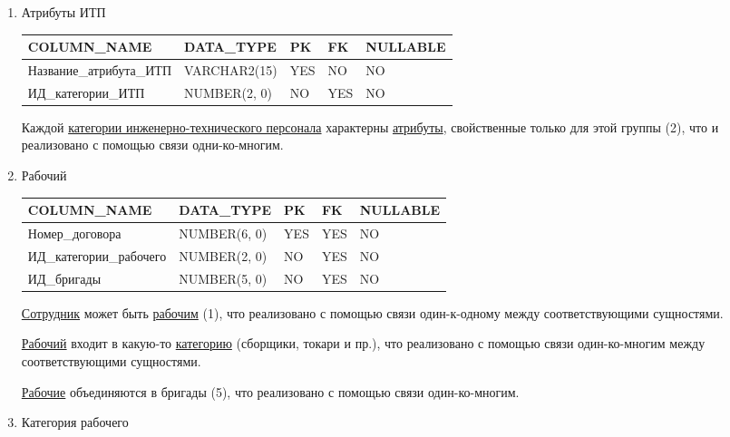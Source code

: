 \begin{enumerate}
\begin{tabular}{|p{4cm}|p{3cm}|p{1cm}|p{1cm}|p{2cm}|}
    \end{tabular}

    \item{Атрибуты ИТП}

    \begin{tabular}{|p{4cm}|p{3cm}|p{1cm}|p{1cm}|p{2cm}|} \hline

        {\bf COLUMN\_NAME} & {\bf DATA\_TYPE} & {\bf PK} & {\bf FK} & {\bf NULLABLE} \\ \hline
        Название\_атрибута\_ИТП & VARCHAR2(15) & YES & NO & NO \\ \hline
        ИД\_категории\_ИТП & NUMBER(2, 0) & NO & YES & NO \\ \hline

    \end{tabular}

    Каждой \underline{категории инженерно-технического персонала} характерны \underline{атрибуты}, свойственные только для этой группы (2), что и реализовано с помощью связи одни-ко-многим.

    \item{Рабочий}

    \begin{tabular}{|p{4cm}|p{3cm}|p{1cm}|p{1cm}|p{2cm}|} \hline

        {\bf COLUMN\_NAME} & {\bf DATA\_TYPE} & {\bf PK} & {\bf FK} & {\bf NULLABLE} \\ \hline
        Номер\_договора & NUMBER(6, 0) & YES & YES & NO \\ \hline
        ИД\_категории\_рабочего & NUMBER(2, 0) & NO & YES & NO \\ \hline
        ИД\_бригады & NUMBER(5, 0) & NO & YES & NO \\ \hline

    \end{tabular}

    \underline{Сотрудник} может быть \underline{рабочим} (1), что реализовано с помощью связи один-к-одному между соответствующими сущностями.

    \underline{Рабочий} входит в какую-то \underline{категорию} (сборщики, токари и пр.), что реализовано с помощью связи один-ко-многим между соответствующими сущностями.

    \underline{Рабочие} объединяются в бригады (5), что реализовано с помощью связи один-ко-многим.

    \item{Категория рабочего}

    \begin{tabular}{|p{4cm}|p{3cm}|p{1cm}|p{1cm}|p{2cm}|} \hline


\end{tabular}
\end{enumerate}
